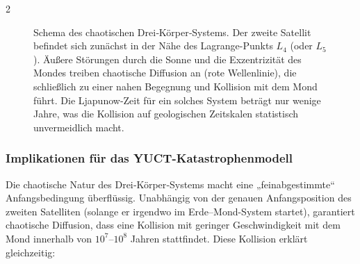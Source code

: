 \documentclass[11pt,a4paper]{article}
\begin{document}
\begin{multicols}{2}
		\begin{figure}[H]
			\centering
			\caption{Schema des chaotischen Drei‑Körper‑Systems. Der zweite Satellit
				befindet sich zunächst in der Nähe des Lagrange-Punkts \(L_4\) (oder \(L_5\)).
				Äußere Störungen durch die Sonne und die Exzentrizität des Mondes treiben
				chaotische Diffusion an (rote Wellenlinie), die schließlich zu einer nahen Begegnung
				und Kollision mit dem Mond führt. Die Ljapunow-Zeit für ein solches System beträgt
				nur wenige Jahre, was die Kollision auf geologischen Zeitskalen statistisch unvermeidlich macht.}
			\label{fig:threebody}
		\end{figure}
		
		\subsubsection{Implikationen für das YUCT-Katastrophenmodell}
		
		Die chaotische Natur des Drei‑Körper‑Systems macht eine „feinabgestimmte“
		Anfangsbedingung überflüssig. Unabhängig von der genauen Anfangsposition
		des zweiten Satelliten (solange er irgendwo im Erde–Mond-System startet),
		garantiert chaotische Diffusion, dass eine Kollision mit geringer Geschwindigkeit mit
		dem Mond innerhalb von \(10^{7}\)–\(10^{8}\) Jahren stattfindet. Diese Kollision
		erklärt gleichzeitig:
		

\end{multicols}
\end{document}
